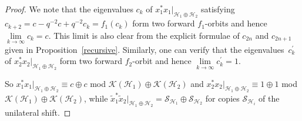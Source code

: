 \documentclass[pdftex]{sigma}
\begin{document}
\begin{proof} We note that the eigenvalues $c_{k}$ of $x_{1}^{\ast}x_{1}%
|_{\mathcal{H}_{1}\oplus\mathcal{H}_{2}}$ satisfying $c_{k+2}=c-q^{-2}%
c+q^{-2}c_{k}=f_{1}( c_{k}) $ form two forward $f_{1}$-orbits and
hence $\lim\limits_{k\rightarrow\infty}c_{k}=c$. This limit is also clear from the
explicit formulae of $c_{2n}$ and $c_{2n+1}$ given in Proposition~\ref{recursive}.
Similarly, one can verify that the eigenvalues~$c_{k}^{\prime}$ of
$x_{2}^{\ast}x_{2}|_{\mathcal{H}_{1}\oplus\mathcal{H}_{2}}$ form two forward
$f_{2}$-orbit and hence $\lim\limits_{k\rightarrow\infty}c_{k}^{\prime}=1$.

So $x_{1}^{\ast}x_{1}|_{\mathcal{H}_{1}\oplus\mathcal{H}_{2}}\equiv c\oplus c$
mod $\mathcal{K}( \mathcal{H}_{1}) \oplus\mathcal{K}(
\mathcal{H}_{2}) $ and $x_{2}^{\ast}x_{2}|_{\mathcal{H}_{1}%
\oplus\mathcal{H}_{2}}\equiv1\oplus1$ mod $\mathcal{K}( \mathcal{H}%
_{1}) \oplus\mathcal{K}( \mathcal{H}_{2}) $, while
$\tilde{x}_{1}^{\ast}\tilde{x}_{2}|_{\mathcal{H}_{1}\oplus\mathcal{H}_{2}%
}=\mathcal{S}_{\mathcal{H}_{1}}\oplus\mathcal{S}_{\mathcal{H}_{2}}$ for copies
$\mathcal{S}_{\mathcal{H}_{i}}$ of the unilateral shift.


\end{proof}
\end{document}
